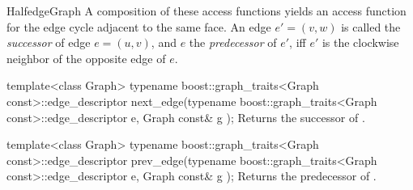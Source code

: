 \begin{ccRefConcept}{HalfedgeGraph}
A composition of these access functions yields an access function for
the edge cycle adjacent to the same face.  An edge $e'=(v,w)$ is
called the {\em successor} of edge $e=(u,v)$, and $e$ the {\em
predecessor} of $e'$, iff $e'$ is the clockwise neighbor of the
opposite edge of $e$.
 

  \ccFunction
  {template<class Graph>
  typename boost::graph_traits<Graph const>::edge_descriptor 
  next_edge(typename boost::graph_traits<Graph const>::edge_descriptor e, Graph const& g );
  }
  {Returns the successor of .}
  
  \ccFunction
  {template<class Graph>
  typename boost::graph_traits<Graph const>::edge_descriptor 
  prev_edge(typename boost::graph_traits<Graph const>::edge_descriptor e, Graph const& g );
  }
  {Returns the predecessor of .}

\ccHasModels
{}

\end{ccRefConcept}
